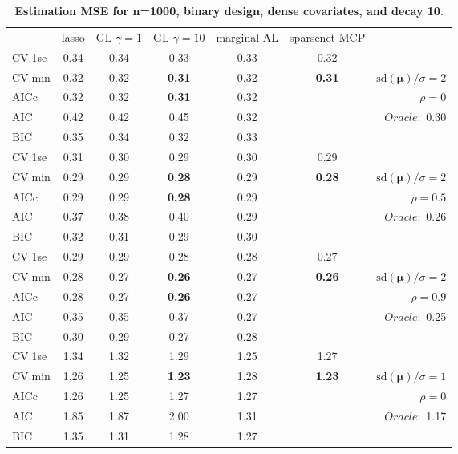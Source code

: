 \clearpage
\begin{table}\vspace{-.5cm}
\caption[l]{ { \bf Estimation MSE for n=1000, binary design, 
dense covariates, and  decay  10}.}
\vspace{-.5cm}
\footnotesize{}
\begin{center}
\begin{tabular}{l*{5}{c}|r}
& lasso & GL $\gamma=1$ & GL $\gamma=10$ & marginal AL & sparsenet MCP  & \\
 \cline{1-7}
CV.1se & 0.34 & 0.34 & 0.33 & 0.33 & 0.32 & \\
CV.min & 0.32 & 0.32 & {\bf 0.31} & 0.32 & {\bf 0.31} &  $\mathrm{sd}(\mathbf{\mu})/\sigma=2$ \\
AICc & 0.32 & 0.32 & {\bf 0.31} & 0.32 & & $\rho=0$ \\
AIC & 0.42 & 0.42 & 0.45 & 0.32 & &  \multirow{2}{*}{$Oracle: $ 0.30} \\
BIC & 0.35 & 0.34 & 0.32 & 0.33 & &  \\
 \hline 
CV.1se & 0.31 & 0.30 & 0.29 & 0.30 & 0.29 & \\
CV.min & 0.29 & 0.29 & {\bf 0.28} & 0.29 & {\bf 0.28} &  $\mathrm{sd}(\mathbf{\mu})/\sigma=2$ \\
AICc & 0.29 & 0.29 & {\bf 0.28} & 0.29 & & $\rho=0.5$ \\
AIC & 0.37 & 0.38 & 0.40 & 0.29 & &  \multirow{2}{*}{$Oracle: $ 0.26} \\
BIC & 0.32 & 0.31 & 0.29 & 0.30 & &  \\
 \hline 
CV.1se & 0.29 & 0.29 & 0.28 & 0.28 & 0.27 & \\
CV.min & 0.28 & 0.27 & {\bf 0.26} & 0.27 & {\bf 0.26} &  $\mathrm{sd}(\mathbf{\mu})/\sigma=2$ \\
AICc & 0.28 & 0.27 & {\bf 0.26} & 0.27 & & $\rho=0.9$ \\
AIC & 0.35 & 0.35 & 0.37 & 0.27 & &  \multirow{2}{*}{$Oracle: $ 0.25} \\
BIC & 0.30 & 0.29 & 0.27 & 0.28 & &  \\
 \hline 
CV.1se & 1.34 & 1.32 & 1.29 & 1.25 & 1.27 & \\
CV.min & 1.26 & 1.25 & {\bf 1.23} & 1.28 & {\bf 1.23} &  $\mathrm{sd}(\mathbf{\mu})/\sigma=1$ \\
AICc & 1.26 & 1.25 & 1.27 & 1.27 & & $\rho=0$ \\
AIC & 1.85 & 1.87 & 2.00 & 1.31 & &  \multirow{2}{*}{$Oracle: $ 1.17} \\
BIC & 1.35 & 1.31 & 1.28 & 1.27 & &  \\

\end{tabular}
\end{center}
\end{table}
